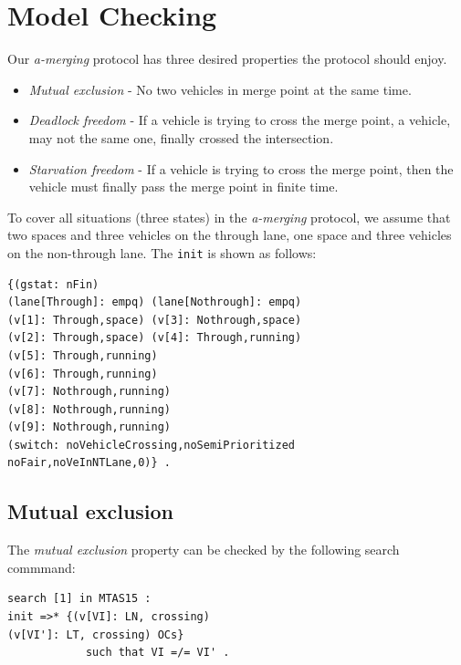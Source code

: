 \documentclass[10pt, conference, compsocconf]{IEEEtran}
\begin{document}
 
\section{Model Checking}
\label{sect_model}
Our \textit{a-merging} protocol has three desired properties the protocol should enjoy.
\begin{itemize}
    \item \textit{Mutual exclusion} - No two vehicles in merge point at the same time.
    \item \textit{Deadlock freedom} - If a vehicle is trying to cross the merge point, a vehicle, may not the same one, finally crossed the intersection.
    \item \textit{Starvation freedom} - If a vehicle is trying to cross the merge point, then the vehicle must finally pass the merge point in finite time.
\end{itemize}

To cover all situations (three states) in the \textit{a-merging} protocol, we assume that two spaces and three vehicles on the through lane, one space and three vehicles on the non-through lane.
The \verb!init! is shown as follows:

\begin{small}
\begin{verbatim}
{(gstat: nFin) 
(lane[Through]: empq) (lane[Nothrough]: empq) 
(v[1]: Through,space) (v[3]: Nothrough,space)
(v[2]: Through,space) (v[4]: Through,running)
(v[5]: Through,running) 
(v[6]: Through,running)
(v[7]: Nothrough,running) 
(v[8]: Nothrough,running)
(v[9]: Nothrough,running)
(switch: noVehicleCrossing,noSemiPrioritized
noFair,noVeInNTLane,0)} .
\end{verbatim}
\end{small}

\subsection{Mutual exclusion}

The \textit{mutual exclusion} property can be checked by the following search commmand:

\begin{small}
\begin{verbatim}
search [1] in MTAS15 : 
init =>* {(v[VI]: LN, crossing) 
(v[VI']: LT, crossing) OCs} 
            such that VI =/= VI' .
\end{verbatim}
\end{small}
\end{document}
